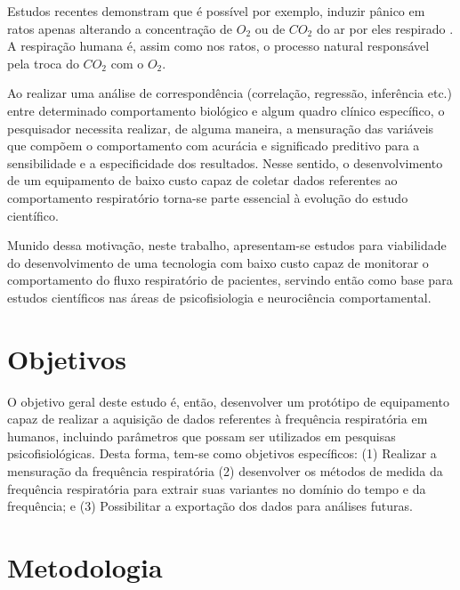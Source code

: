    Estudos recentes demonstram que é possível por exemplo, induzir pânico em ratos apenas alterando a concentração de $O_2$ ou de $CO_2$ do ar por eles respirado \cite{spiacci2015serotonin} \cite{spiacci2018panic}. A respiração humana é, assim como nos ratos, o processo natural responsável pela troca do $CO_2$ com o $O_2$.    
    
   Ao realizar uma análise de correspondência (correlação, regressão, inferência etc.) entre determinado comportamento biológico e algum quadro clínico específico, o 		pesquisador necessita realizar, de alguma maneira, a mensuração das variáveis que compõem o comportamento com acurácia e significado preditivo para a sensibilidade e a especificidade dos resultados. Nesse sentido, o desenvolvimento de um equipamento de baixo custo capaz de coletar dados referentes ao comportamento respiratório torna-se parte essencial à evolução do estudo científico. 
      
   Munido dessa motivação, neste trabalho, apresentam-se estudos para viabilidade do desenvolvimento de uma tecnologia com baixo custo capaz de monitorar o comportamento do fluxo respiratório de pacientes, servindo então como base para estudos científicos nas áreas de psicofisiologia e neurociência comportamental. 
 
  \section{Objetivos}
  
	O objetivo geral deste estudo é, então, desenvolver um protótipo de equipamento capaz de realizar a aquisição de dados referentes à frequência respiratória em humanos, incluindo parâmetros que possam ser utilizados em pesquisas psicofisiológicas. Desta forma, tem-se como objetivos específicos: (1) Realizar a mensuração da frequência respiratória (2) desenvolver os métodos de medida da frequência respiratória para extrair suas variantes no domínio do tempo e da frequência; e (3) Possibilitar a exportação dos dados para análises futuras.
  
  
  \section{Metodologia}

